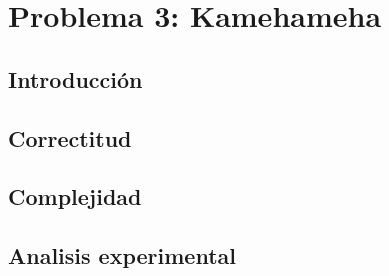 \section{Problema 3: Kamehameha}
\subsection{Introducción}

\subsection{Correctitud}

\subsection{Complejidad}

\subsection{Analisis experimental}


